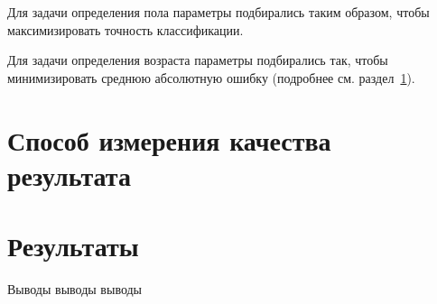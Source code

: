 Для задачи определения пола параметры подбирались таким
образом, чтобы максимизировать точность классификации. 

Для задачи определения возраста параметры подбирались так, чтобы
минимизировать среднюю абсолютную ошибку (подробнее см.
раздел~\ref{sec:result_quality}).

\section{Способ измерения качества результата}
\label{sec:result_quality}

\section{Результаты}
\label{sec:results}

\chapterconclusion

Выводы выводы выводы
